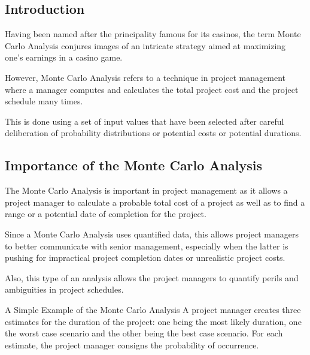 \subsection{Introduction}
Having been named after the principality famous for its casinos, the term Monte Carlo Analysis conjures images of an intricate strategy aimed at maximizing one's earnings in a casino game.

However, Monte Carlo Analysis refers to a technique in project management where a manager computes and calculates the total project cost and the project schedule many times.

This is done using a set of input values that have been selected after careful deliberation of probability distributions or potential costs or potential durations.

\subsection{Importance of the Monte Carlo Analysis}
The Monte Carlo Analysis is important in project management as it allows a project manager to calculate a probable total cost of a project as well as to find a range or a potential date of completion for the project.

Since a Monte Carlo Analysis uses quantified data, this allows project managers to better communicate with senior management, especially when the latter is pushing for impractical project completion dates or unrealistic project costs.

Also, this type of an analysis allows the project managers to quantify perils and ambiguities in project schedules.

A Simple Example of the Monte Carlo Analysis
A project manager creates three estimates for the duration of the project: one being the most likely duration, one the worst case scenario and the other being the best case scenario. For each estimate, the project manager consigns the probability of occurrence.

